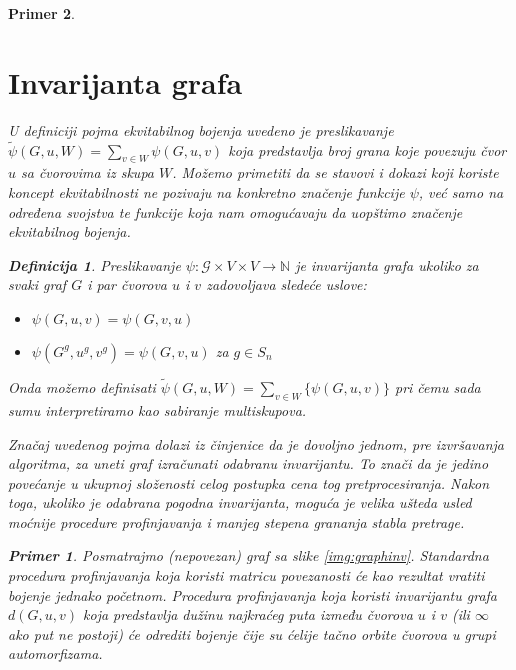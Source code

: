 \documentclass[12pt,oneside]{memoir}
\newtheorem{example}{Primer}
\theoremstyle{definition}
\newtheorem*{definition}{Definicija}
\begin{document}
\begin{example}
 \section{Invarijanta grafa}

  U definiciji pojma ekvitabilnog bojenja uvedeno je preslikavanje
  $\widetilde{\psi}(G, u, W) = \sum_{v \in W} \psi(G, u, v)$ koja predstavlja
  broj grana koje povezuju čvor $u$ sa čvorovima iz skupa $W$. Možemo primetiti
  da se stavovi i dokazi koji koriste koncept ekvitabilnosti ne pozivaju na
  konkretno značenje funkcije $\psi$, već samo na određena svojstva te funkcije
  koja nam omogućavaju da uopštimo značenje ekvitabilnog bojenja.

  \begin{definition}
	  Preslikavanje $\psi : \mathcal{G} \times V \times V \to \mathbb{N}$ je
	  \emph{invarijanta grafa} ukoliko za svaki graf $G$ i par čvorova $u$ i $v$
	  zadovoljava sledeće uslove:

	  \begin{itemize}
		  \item[($\psi1$)] $\psi(G, u, v) = \psi(G, v, u)$
		  \item[($\psi2$)] $\psi(G^g, u^g, v^g) = \psi(G, v, u)$ za $g \in S_n$
	  \end{itemize}
  \end{definition}

  Onda možemo definisati $\widetilde{\psi}(G, u, W) = \sum_{v \in W} \{\psi(G, u, v)\}$ pri
  čemu sada sumu interpretiramo kao sabiranje multiskupova.

  Značaj uvedenog pojma dolazi iz činjenice da je dovoljno jednom, pre
  izvršavanja algoritma, za uneti graf izračunati odabranu invarijantu. To
  znači da je jedino povećanje u ukupnoj složenosti celog postupka cena tog
  pretprocesiranja. Nakon toga, ukoliko je odabrana pogodna invarijanta, moguća
  je velika ušteda usled moćnije procedure profinjavanja i manjeg stepena
  grananja stabla pretrage.

  \begin{example}
	  Posmatrajmo (nepovezan) graf sa slike \ref{img:graphinv}. Standardna
	  procedura profinjavanja koja koristi matricu povezanosti će kao rezultat
	  vratiti bojenje jednako početnom. Procedura profinjavanja koja koristi
	  invarijantu grafa $d(G, u, v)$ koja predstavlja dužinu najkraćeg puta
	  između čvorova $u$ i $v$ (ili $\infty$ ako put ne postoji) će odrediti
	  bojenje čije su ćelije tačno orbite čvorova u grupi automorfizama.
  \end{example}


\end{example}
\end{document}
